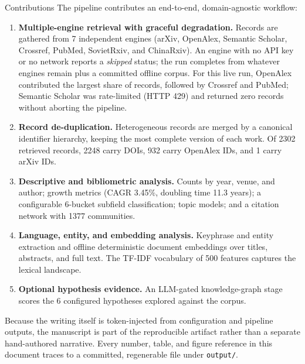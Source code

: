 \documentclass[
  ignorenonframetext,
]{beamer}
\begin{document}
\begin{frame}{Contributions}
\protect{}\label{contributions}
The pipeline contributes an end-to-end, domain-agnostic workflow:

\begin{enumerate}
\item
  \textbf{Multiple-engine retrieval with graceful degradation.} Records
  are gathered from 7 independent engines (arXiv, OpenAlex, Semantic
  Scholar, Crossref, PubMed, SovietRxiv, and ChinaRxiv). An engine with
  no API key or no network reports a \emph{skipped} status; the run
  completes from whatever engines remain plus a committed offline
  corpus. For this live run, OpenAlex contributed the largest share of
  records, followed by Crossref and PubMed; Semantic Scholar was
  rate-limited (HTTP 429) and returned zero records without aborting the
  pipeline.
\item
  \textbf{Record de-duplication.} Heterogeneous records are merged by a
  canonical identifier hierarchy, keeping the most complete version of
  each work. Of 2302 retrieved records, 2248 carry DOIs, 932 carry
  OpenAlex IDs, and 1 carry arXiv IDs.
\item
  \textbf{Descriptive and bibliometric analysis.} Counts by year, venue,
  and author; growth metrics (CAGR 3.45\%, doubling time 11.3 years); a
  configurable 6-bucket subfield classification; topic models; and a
  citation network with 1377 communities.
\item
  \textbf{Language, entity, and embedding analysis.} Keyphrase and
  entity extraction and offline deterministic document embeddings over
  titles, abstracts, and full text. The TF-IDF vocabulary of 500
  features captures the lexical landscape.
\item
  \textbf{Optional hypothesis evidence.} An LLM-gated knowledge-graph
  stage scores the 6 configured hypotheses explored against the corpus.
\end{enumerate}

Because the writing itself is token-injected from configuration and
pipeline outputs, the manuscript is part of the reproducible artifact
rather than a separate hand-authored narrative. Every number, table, and
figure reference in this document traces to a committed, regenerable
file under \texttt{output/}.
\end{frame}
\end{document}
